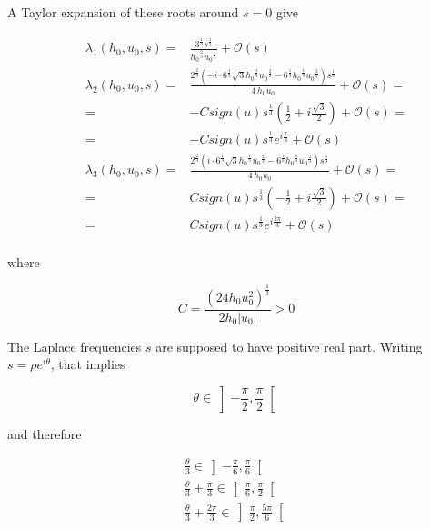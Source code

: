 \indent A Taylor expansion of these roots around $s = 0$ give

\begin{equation}
	\label{eq:taylor3}
	\begin{aligned}
		&& \lambda_1\left( {{h_0}}, {{u_0}}, s \right) = & \frac{3^{\frac{1}{3}} s^{\frac{1}{3}}}{{{h_0}}^{\frac{2}{3}} {{u_0}}^{\frac{1}{3}}} + \mathcal{O}(s) \\
		&& \lambda_2\left( {{h_0}}, {{u_0}}, s \right) = & \frac{2^{\frac{2}{3}} {\left(-i \cdot 6^{\frac{1}{3}} \sqrt{3} {{h_0}}^{\frac{1}{3}} {{u_0}}^{\frac{2}{3}} - 6^{\frac{1}{3}} {{h_0}}^{\frac{1}{3}} {{u_0}}^{\frac{2}{3}}\right)} s^{\frac{1}{3}}}{4 \, {{h_0}} {{u_0}}} + \mathcal{O}(s) = \\
		&& = & -C sign(u) s^{\frac{1}{3}} \left( \frac{1}{2} + i\frac{\sqrt{3}}{2}\right) + \mathcal{O}(s) = \\
		&& = & -C sign(u) s^{\frac{1}{3}} e^{i\frac{\pi}{3}} + \mathcal{O}(s) \\
		&& \lambda_3\left( {{h_0}}, {{u_0}}, s \right) = & \frac{2^{\frac{2}{3}} {\left(i \cdot 6^{\frac{1}{3}} \sqrt{3} {{h_0}}^{\frac{1}{3}} {{u_0}}^{\frac{2}{3}} - 6^{\frac{1}{3}} {{h_0}}^{\frac{1}{3}} {{u_0}}^{\frac{2}{3}}\right)} s^{\frac{1}{3}}}{4 \, {{h_0}} {{u_0}}} + \mathcal{O}(s) = \\
		&& = & C sign(u) s^{\frac{1}{3}} \left( -\frac{1}{2} + i\frac{\sqrt{3}}{2}\right) + \mathcal{O}(s) = \\
		&& = & C sign(u) s^{\frac{1}{3}} e^{i\frac{2\pi}{3}} + \mathcal{O}(s) \\
	\end{aligned}
\end{equation}

\noindent where

\begin{equation*}
	C = \frac{\left(24h_0u_0^2\right)^{\frac{1}{3}}}{2h_0|u_0|} > 0
\end{equation*}

\indent The Laplace frequencies $s$ are supposed to have positive real part. Writing $s = \rho e ^{i\theta}$, that implies

\begin{equation*}
	\theta \in \left] -\frac{\pi}{2}, \frac{\pi}{2} \right[
\end{equation*}

\indent and therefore

\begin{equation}
\label{eq:domaineAngles}
\begin{gathered}
	\frac{\theta}{3} \in \left] -\frac{\pi}{6}, \frac{\pi}{6} \right[ \\
	\frac{\theta}{3} + \frac{\pi}{3} \in \left] \frac{\pi}{6}, \frac{\pi}{2} \right[ \\
	\frac{\theta}{3} + \frac{2\pi}{3} \in \left] \frac{\pi}{2}, \frac{5\pi}{6} \right[
\end{gathered}
\end{equation}

